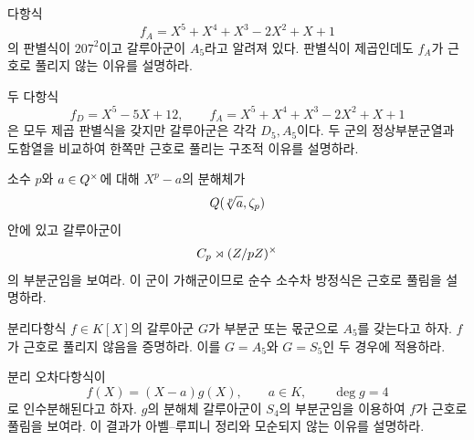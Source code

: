 \begin{exercise}
다항식
\[
  f_A=X^5+X^4+X^3-2X^2+X+1
\]
의 판별식이 $207^2$이고 갈루아군이 $A_5$라고 알려져 있다. 판별식이 제곱인데도 $f_A$가 근호로 풀리지 않는 이유를 설명하라.
\end{exercise}

\begin{exercise}[*]
두 다항식
\[
  f_D=X^5-5X+12,
  \qquad
  f_A=X^5+X^4+X^3-2X^2+X+1
\]
은 모두 제곱 판별식을 갖지만 갈루아군은 각각 $D_5,A_5$이다. 두 군의 정상부분군열과 도함열을 비교하여 한쪽만 근호로 풀리는 구조적 이유를 설명하라.
\end{exercise}

\begin{exercise}
소수 $p$와 $a\in Q^\times$에 대해 $X^p-a$의 분해체가
\[
  Q(\sqrt[p]{a},\zeta_p)
\]
안에 있고 갈루아군이
\[
  C_p\rtimes(Z/pZ)^\times
\]
의 부분군임을 보여라. 이 군이 가해군이므로 순수 소수차 방정식은 근호로 풀림을 설명하라.
\end{exercise}

\begin{exercise}[*]
분리다항식 $f\in K[X]$의 갈루아군 $G$가 부분군 또는 몫군으로 $A_5$를 갖는다고 하자. $f$가 근호로 풀리지 않음을 증명하라. 이를 $G=A_5$와 $G=S_5$인 두 경우에 적용하라.
\end{exercise}

\begin{exercise}
분리 오차다항식이
\[
  f(X)=(X-a)g(X),
  \qquad a\in K,
  \qquad \deg g=4
\]
로 인수분해된다고 하자. $g$의 분해체 갈루아군이 $S_4$의 부분군임을 이용하여 $f$가 근호로 풀림을 보여라. 이 결과가 아벨--루피니 정리와 모순되지 않는 이유를 설명하라.
\end{exercise}

